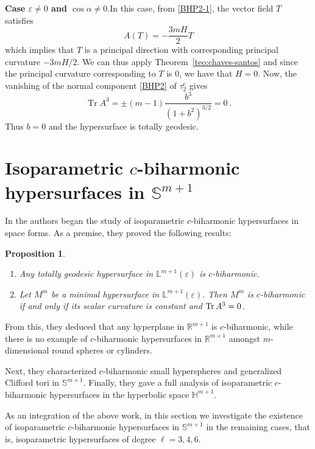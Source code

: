 \documentclass[11pt,leqno]{amsart}
\theoremstyle{plain}
\newtheorem{proposition}  [theorem]  {Proposition}
\theoremstyle{definition}
\numberwithin{equation}{section}
\def \R{{\mathbb R}}
\def \s{{\mathbb S}}
\def \h{{\mathbb H}}
\DeclareMathOperator{\trace}{Tr}
\numberwithin{equation}{section}
\begin{document}
{\textbf{Case $\varepsilon\neq 0$ and $ \cos\alpha\neq 0$}.\quad In this case, from \eqref{BHP2-1}, the vector field $T$ satisfies
\begin{equation}\label{eq:Tprincipal}
A(T)=-\frac{3mH}{2}T
\end{equation}
which implies that $T$ is a principal direction with corresponding principal curvature $-3mH/2$. We can thus apply Theorem~\ref{teo:chaves-santos} and since the principal curvature corresponding to $T$ is $0$, we have that $H=0$. Now, the vanishing of the normal component \eqref{BHP2} of $\tau_2^c$ gives
\[
\trace A^3=\pm (m-1)\frac{b^3}{(1+b^2)^{3/2}}=0\,.
\]
Thus $b=0$ and the hypersurface is totally geodesic.

\section{Isoparametric $c$-biharmonic hypersurfaces in $\s^{m+1}$}\label{isoparametric-in-sm}\label{sec-iso-Sn}

In \cite{arXiv:2311.04493} the authors began the study of isoparametric $c$-biharmonic hypersurfaces in space forms. As a premise, they proved the following results:
\begin{proposition}\label{prop-BNO-general}\quad
\begin{enumerate}
\item[{\rm (a)}] Any totally geodesic hypersurface in ${\mathbb L}^{m+1}(\varepsilon)$ is $c$-biharmonic.
\item[{\rm (b)}] Let $M^m$ be a minimal hypersurface in ${\mathbb L}^{m+1}(\varepsilon)$. Then $M^m$ is $c$-biharmonic if and only if its scalar curvature is constant and ${\rm Tr}\,A^3=0$. 
\end{enumerate}
\end{proposition}

From this, they deduced that any hyperplane in $\R^{m+1}$ is $c$-biharmonic, while there is no example of $c$-biharmonic hypersurfaces in $\R^{m+1}$ amongst $m$-dimensional round spheres or cylinders.

Next, they characterized $c$-biharmonic small hyperspheres and generalized Clifford tori in $\s^{m+1}$. Finally, they gave a full analysis of isoparametric $c$-biharmonic hypersurfaces  in the hyperbolic space $\h^{m+1}$.

As an integration of the above work, in this section we investigate the existence of isoparametric $c$-biharmonic  hypersurfaces in $\s^{m+1}$ in the remaining cases, that is, isoparametric hypersurfaces of degree $\ell=3,4,6$.  

}
\end{document}
